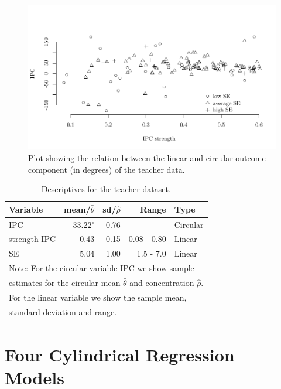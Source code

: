 \documentclass[man,mask]{apa6}
\begin{document}
\begin{figure}
\centering
\includegraphics[width = \textwidth]{Plots/dataplot.pdf}
\caption{Plot showing the relation between the linear and circular outcome component (in degrees) of the teacher data.}
\label{dataplot}
\end{figure}

\begin{table}[h]
\centering
\caption{Descriptives for the teacher dataset.} 
\begin{tabular}{lrrrl}
  \noalign{\smallskip}\hline\noalign{\smallskip}
Variable & mean/$\bar{\theta}$ & sd/$\hat{\rho}$ & Range & Type \\ \hline\noalign{\smallskip}
IPC &33.22$^\circ$& 0.76 & - & Circular\\
strength IPC & 0.43 & 0.15 & 0.08 - 0.80 & Linear\\
SE & 5.04 & 1.00 & 1.5 - 7.0 & Linear\\
   \hline
\multicolumn{5}{l}{Note: For the circular variable IPC we show sample }\\
\multicolumn{5}{l}{estimates for the circular mean $\bar{\theta}$ and concentration $\hat{\rho}$.}\\
\multicolumn{5}{l}{For the linear variable we show the sample mean,}\\
\multicolumn{5}{l}{standard deviation and range.}
\end{tabular}
\label{Tableteacherdescriptives}
\end{table}

\vspace{-0.75cm}
\section{Four Cylindrical Regression Models}\label{Models}
\vspace{-0.75cm}
\end{document}
